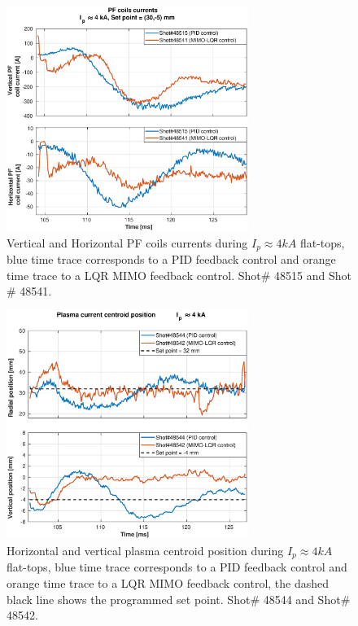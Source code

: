 \begin{figure}
	\centering
	\includegraphics[width=0.7\textwidth]{Chp5/PIDvsMIMO_515_541_curr_2.eps}
	\caption{   Vertical and Horizontal PF coils currents during  $I_p\approx 4kA$  flat-tops, blue time trace corresponds to a PID feedback control and orange time trace to a LQR MIMO feedback control. Shot$\#$ 48515 and Shot$\#$ 48541.}
\end{figure}

\begin{figure}
	\centering
	\includegraphics[width=0.7\textwidth]{Chp5/PIDvsMIMO_544_542_2.eps}
	\caption{Horizontal and vertical plasma centroid position during  $I_p\approx 4kA$  flat-tops, blue time trace corresponds to a PID feedback control and orange time trace to a LQR MIMO feedback control, the dashed black line shows the programmed set point.   Shot$\#$ 48544 and Shot$\#$ 48542.}
\end{figure}

